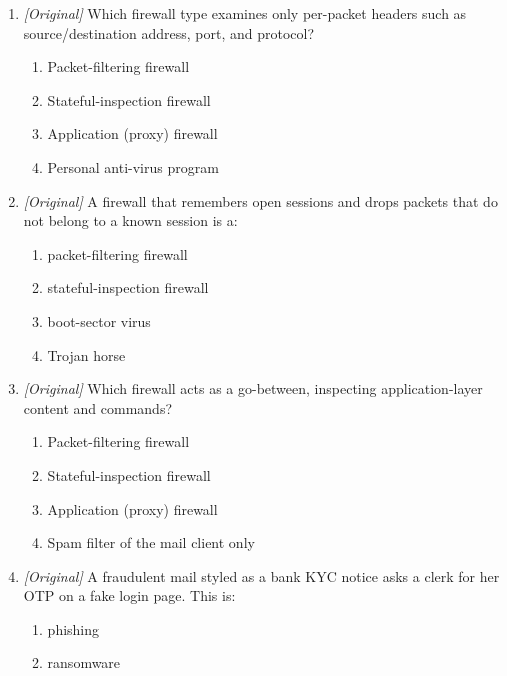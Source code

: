 \begin{enumerate}[label=\textbf{Q\arabic*.}, leftmargin=*]
  \begin{enumerate}[label=\Alph*.]
    \item confidentiality; authenticity and integrity
    \item authenticity; confidentiality
    \item availability; confidentiality
    \item integrity; availability
  \end{enumerate}
\item \textit{[Original]} Which firewall type examines only per-packet headers such as source/destination address, port, and protocol?
  \begin{enumerate}[label=\Alph*.]
    \item Packet-filtering firewall
    \item Stateful-inspection firewall
    \item Application (proxy) firewall
    \item Personal anti-virus program
  \end{enumerate}
\item \textit{[Original]} A firewall that remembers open sessions and drops packets that do not belong to a known session is a:
  \begin{enumerate}[label=\Alph*.]
    \item packet-filtering firewall
    \item stateful-inspection firewall
    \item boot-sector virus
    \item Trojan horse
  \end{enumerate}
\item \textit{[Original]} Which firewall acts as a go-between, inspecting application-layer content and commands?
  \begin{enumerate}[label=\Alph*.]
    \item Packet-filtering firewall
    \item Stateful-inspection firewall
    \item Application (proxy) firewall
    \item Spam filter of the mail client only
  \end{enumerate}
\item \textit{[Original]} A fraudulent mail styled as a bank KYC notice asks a clerk for her OTP on a fake login page. This is:
  \begin{enumerate}[label=\Alph*.]
    \item phishing
    \item ransomware

\end{enumerate}
\end{enumerate}
